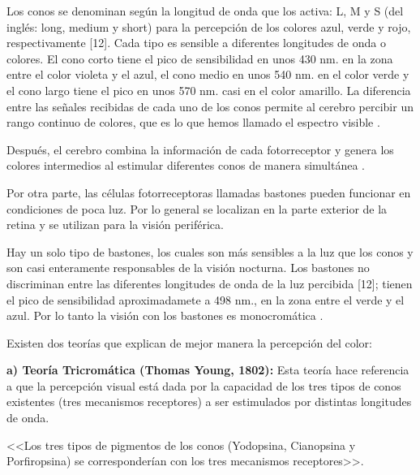 \documentclass[10pt]{article}
\begin{document}
Los conos se denominan según la longitud de onda que los activa: L, M y S (del inglés: long, medium y short) para la percepción de los colores azul, verde y rojo, respectivamente [12]. Cada tipo es sensible a diferentes longitudes de onda o colores. El cono corto tiene el pico de sensibilidad en unos 430 nm. en la zona entre el color violeta y el azul, el cono medio en unos 540 nm. en el color verde y el cono largo tiene el pico en unos 570 nm. casi en el color amarillo. La diferencia entre las señales recibidas de cada uno de los conos permite al cerebro percibir un rango continuo de colores, que es lo que hemos llamado el espectro visible \cite{IEEEreferencias:Ref13}.

\setlength{\parskip}{2mm}

Después, el cerebro combina la información de cada fotorreceptor y genera los colores intermedios al estimular diferentes conos de manera simultánea \cite{IEEEreferencias:Ref12}.

\setlength{\parskip}{2mm}

Por otra parte, las células fotorreceptoras llamadas bastones pueden funcionar en condiciones de poca luz. Por lo general se localizan en la parte exterior de la retina y se utilizan para la visión periférica.

\setlength{\parskip}{2mm}

Hay un solo tipo de bastones, los cuales son más sensibles a la luz que los conos y son casi enteramente responsables de la visión nocturna. Los bastones no discriminan entre las diferentes longitudes de onda de la luz percibida [12]; tienen el pico de sensibilidad aproximadamete a 498 nm., en la zona entre el verde y el azul. Por lo tanto la visión con los bastones es monocromática \cite{IEEEreferencias:Ref13}.

\setlength{\parskip}{2mm}

Existen dos teorías que explican de mejor manera la percepción del color:

\textbf{a)	Teoría Tricromática (Thomas Young, 1802):}
 Esta teoría hace referencia a que la  percepción visual está dada por la capacidad de los tres tipos de conos existentes (tres mecanismos receptores) a ser estimulados por distintas longitudes de onda. 
 
\setlength{\parskip}{2mm} 
 
<<Los tres tipos de pigmentos de los conos (Yodopsina, Cianopsina y Porfiropsina) se corresponderían con los tres mecanismos receptores>>\cite{IEEEreferencias:Ref14}.
\end{document}
